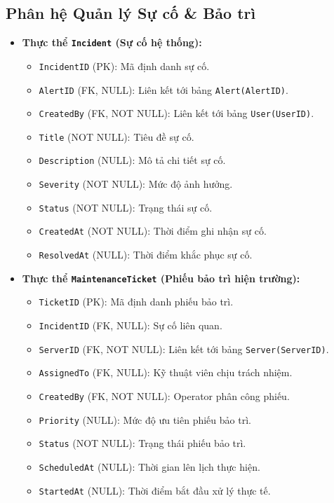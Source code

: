 \subsection{Phân hệ Quản lý Sự cố \& Bảo trì}
\begin{itemize}[leftmargin=2em]
    \item \textbf{Thực thể \texttt{Incident} (Sự cố hệ thống):}
    \begin{itemize}
        \item \texttt{IncidentID} (PK): Mã định danh sự cố.
        \item \texttt{AlertID} (FK, NULL): Liên kết tới bảng \texttt{Alert(AlertID)}.
        \item \texttt{CreatedBy} (FK, NOT NULL): Liên kết tới bảng \texttt{User(UserID)}.
        \item \texttt{Title} (NOT NULL): Tiêu đề sự cố.
        \item \texttt{Description} (NULL): Mô tả chi tiết sự cố.
        \item \texttt{Severity} (NOT NULL): Mức độ ảnh hưởng.
        \item \texttt{Status} (NOT NULL): Trạng thái sự cố.
        \item \texttt{CreatedAt} (NOT NULL): Thời điểm ghi nhận sự cố.
        \item \texttt{ResolvedAt} (NULL): Thời điểm khắc phục sự cố.
    \end{itemize}
    \item \textbf{Thực thể \texttt{MaintenanceTicket} (Phiếu bảo trì hiện trường):}
    \begin{itemize}
        \item \texttt{TicketID} (PK): Mã định danh phiếu bảo trì.
        \item \texttt{IncidentID} (FK, NULL): Sự cố liên quan.
        \item \texttt{ServerID} (FK, NOT NULL): Liên kết tới bảng \texttt{Server(ServerID)}.
        \item \texttt{AssignedTo} (FK, NULL): Kỹ thuật viên chịu trách nhiệm.
        \item \texttt{CreatedBy} (FK, NOT NULL): Operator phân công phiếu.
        \item \texttt{Priority} (NULL): Mức độ ưu tiên phiếu bảo trì.
        \item \texttt{Status} (NOT NULL): Trạng thái phiếu bảo trì.
        \item \texttt{ScheduledAt} (NULL): Thời gian lên lịch thực hiện.
        \item \texttt{StartedAt} (NULL): Thời điểm bắt đầu xử lý thực tế.

\end{itemize}
\end{itemize}
